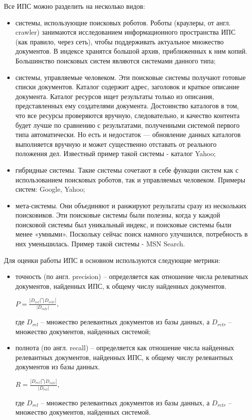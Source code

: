 Все ИПС можно разделить на несколько видов:
\begin{itemize}
\item системы, использующие поисковых роботов. Роботы (краулеры, от англ. crawler) занимаются исследованием информационного пространства ИПС (как правило, через сеть), чтобы поддерживать актуальное множество документов. В индексе хранятся большой архив, приближенных к ним копий. Большинство поисковых систем являются системами данного типа;
\item системы, управляемые человеком. Эти поисковые системы получают готовые списки документов. Каталог содержит адрес, заголовок и краткое описание документа. Каталог ресурсов ищет результаты только из описания, представленных ему создателями документа. Достоинство каталогов в том, что все ресурсы проверяются вручную, следовательно, и качество контента будет лучше по сравнению с результатами, полученными системой первого типа автоматически. Но есть и недостаток — обновление данных каталогов выполняется вручную и может существенно отставать от реального положения дел. Известный пример такой системы - каталог Yahoo;
\item гибридные системы. Такие системы сочетают в себе функции систем как с использованием поисковых роботов, так и управляемых человеком. Примеры систем: Google, Yahoo;
\item мета-системы. Они объединяют и ранжируют результаты сразу из нескольких поисковиков. Эти поисковые системы были полезны, когда у каждой поисковой системы был уникальный индекс, и поисковые системы были менее «умными». Поскольку сейчас поиск намного улучшился, потребность в них уменьшилась. Пример такой системы - MSN Search.
\end{itemize}

Для оценки работы ИПС в основном используются следующие метрики:
\begin{itemize}
\item точность (по англ. precision) -- определяется как отношение числа релеватных документов, найденных ИПС, к общему числу найденных документов.

\begin{center}
$P = \frac{| D_{rel} \bigcap D_{retr} |}{| D_{retr} |}$,
\end{center} где $D_{rel}$ -- множество релевантных документов из базы данных, а $D_{retr}$ -- множество документов, найденных системой;
\item полнота (по англ. recall) -- определяется как отношение числа найденных релевантных документов, найденных ИПС, к общему числу релевантных документов из базы данных.
\begin{center}
$R = \frac{| D_{rel} \bigcap D_{retr} |}{| D_{rel} |}$,
\end{center} где $D_{rel}$ -- множество релевантных документов из базы данных, а $D_{retr}$ -- множество документов, найденных системой. 
\end{itemize}

